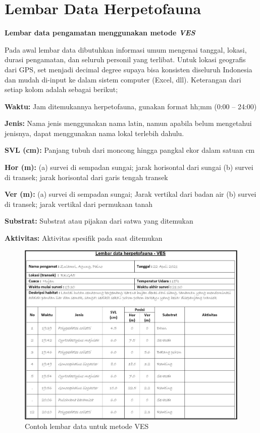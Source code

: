 \documentclass[
]{book}
\begin{document}
\hypertarget{lembar-data-herpetofauna}{%
\section*{Lembar Data Herpetofauna}\label{lembar-data-herpetofauna}}

\textbf{Lembar data pengamatan menggunakan metode \emph{VES}}

Pada awal lembar data dibutuhkan informasi umum mengenai tanggal, lokasi, durasi pengamatan, dan seluruh personil yang terlibat. Untuk lokasi geografis dari GPS, set menjadi decimal degree supaya bisa konsisten diseluruh Indonesia dan mudah di-input ke dalam sistem computer (Excel, dll). Keterangan dari setiap kolom adalah sebagai berikut;

\textbf{Waktu:} Jam ditemukannya herpetofauna, gunakan format hh;mm (0:00 -- 24:00)

\textbf{Jenis:} Nama jenis menggunakan nama latin, namun apabila belum mengetahui jenisnya, dapat menggunakan nama lokal terlebih dahulu.

\textbf{SVL (cm):} Panjang tubuh dari moncong hingga pangkal ekor dalam satuan cm

\textbf{Hor (m):} (a) survei di sempadan sungai; jarak horisontal dari sungai (b) survei di transek; jarak horisontal dari garis tengah transek

\textbf{Ver (m):} (a) survei di sempadan sungai; Jarak vertikal dari badan air (b) survei di transek; jarak vertikal dari permukaan tanah

\textbf{Substrat:} Substrat atau pijakan dari satwa yang ditemukan

\textbf{Aktivitas:} Aktivitas spesifik pada saat ditemukan

\begin{figure}

{\centering \includegraphics[width=1\linewidth]{images/ldh_ves} 

}

\caption{Contoh lembar data untuk metode VES}\label{fig:ldhves}
\end{figure}
\end{document}
